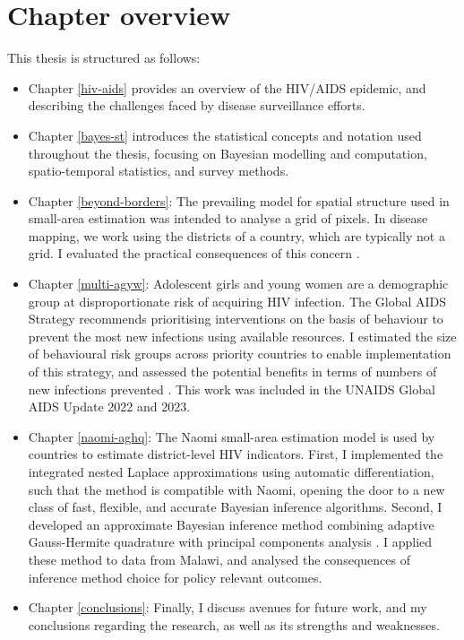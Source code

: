 \documentclass[a4paper, nobind]{templates/ociamthesis}
\providecommand{\tightlist}{%
  \setlength{\itemsep}{0pt}\setlength{\parskip}{0pt}}
\begin{document}
\hypertarget{chapter-overview}{%
\section{Chapter overview}\label{chapter-overview}}

This thesis is structured as follows:

\begin{itemize}
\tightlist
\item
  Chapter \ref{hiv-aids} provides an overview of the HIV/AIDS epidemic, and describing the challenges faced by disease surveillance efforts.
\item
  Chapter \ref{bayes-st} introduces the statistical concepts and notation used throughout the thesis, focusing on Bayesian modelling and computation, spatio-temporal statistics, and survey methods.
\item
  Chapter \ref{beyond-borders}: The prevailing model for spatial structure used in small-area estimation \autocite{besag1991bayesian} was intended to analyse a grid of pixels.
  In disease mapping, we work using the districts of a country, which are typically not a grid.
  I evaluated the practical consequences of this concern \autocite{howes2023beyond}.
\item
  Chapter \ref{multi-agyw}: Adolescent girls and young women are a demographic group at disproportionate risk of acquiring HIV infection.
  The Global AIDS Strategy recommends prioritising interventions on the basis of behaviour to prevent the most new infections using available resources.
  I estimated the size of behavioural risk groups across priority countries to enable implementation of this strategy, and assessed the potential benefits in terms of numbers of new infections prevented \autocite{howes2023spatio}.
  This work was included in the UNAIDS Global AIDS Update 2022 and 2023.
\item
  Chapter \ref{naomi-aghq}: The Naomi small-area estimation model \autocite{eaton2021naomi} is used by countries to estimate district-level HIV indicators.
  First, I implemented the integrated nested Laplace approximations using automatic differentiation, such that the method is compatible with Naomi, opening the door to a new class of fast, flexible, and accurate Bayesian inference algorithms.
  Second, I developed an approximate Bayesian inference method combining adaptive Gauss-Hermite quadrature with principal components analysis \autocite{howes2023fast}.
  I applied these method to data from Malawi, and analysed the consequences of inference method choice for policy relevant outcomes.
\item
  Chapter \ref{conclusions}: Finally, I discuss avenues for future work, and my conclusions regarding the research, as well as its strengths and weaknesses.
\end{itemize}
\end{document}
